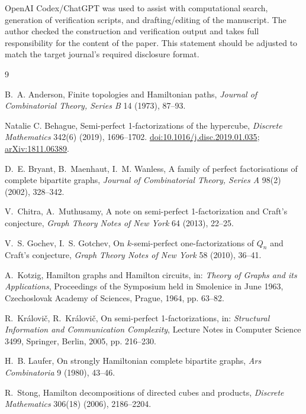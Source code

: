 \documentclass[11pt]{article}
\begin{document}
OpenAI Codex/ChatGPT was used to assist with computational search, generation
of verification scripts, and drafting/editing of the manuscript.  The author
checked the construction and verification output and takes full responsibility
for the content of the paper.  This statement should be adjusted to match the
target journal's required disclosure format.

\begin{thebibliography}{9}

B.~A. Anderson,
\newblock Finite topologies and Hamiltonian paths,
\newblock \emph{Journal of Combinatorial Theory, Series B} 14 (1973),
87--93.

Natalie C. Behague,
\newblock Semi-perfect 1-factorizations of the hypercube,
\newblock \emph{Discrete Mathematics} 342(6) (2019), 1696--1702.
\newblock \href{https://doi.org/10.1016/j.disc.2019.01.035}{doi:10.1016/j.disc.2019.01.035};
\href{https://arxiv.org/abs/1811.06389}{arXiv:1811.06389}.

D.~E. Bryant, B.~Maenhaut, I.~M. Wanless,
\newblock A family of perfect factorisations of complete bipartite graphs,
\newblock \emph{Journal of Combinatorial Theory, Series A} 98(2) (2002),
328--342.

V.~Chitra, A.~Muthusamy,
\newblock A note on semi-perfect 1-factorization and Craft's conjecture,
\newblock \emph{Graph Theory Notes of New York} 64 (2013), 22--25.

V.~S. Gochev, I.~S. Gotchev,
\newblock On \(k\)-semi-perfect one-factorizations of \(Q_n\) and Craft's
conjecture,
\newblock \emph{Graph Theory Notes of New York} 58 (2010), 36--41.

A.~Kotzig,
\newblock Hamilton graphs and Hamilton circuits,
\newblock in: \emph{Theory of Graphs and its Applications}, Proceedings of
the Symposium held in Smolenice in June 1963, Czechoslovak Academy of
Sciences, Prague, 1964, pp. 63--82.

R.~Kr\'alovi\v{c}, R.~Kr\'alovi\v{c},
\newblock On semi-perfect 1-factorizations,
\newblock in: \emph{Structural Information and Communication Complexity},
Lecture Notes in Computer Science 3499, Springer, Berlin, 2005, pp. 216--230.

H.~B. Laufer,
\newblock On strongly Hamiltonian complete bipartite graphs,
\newblock \emph{Ars Combinatoria} 9 (1980), 43--46.

R.~Stong,
\newblock Hamilton decompositions of directed cubes and products,
\newblock \emph{Discrete Mathematics} 306(18) (2006), 2186--2204.

\end{thebibliography}
\end{document}
